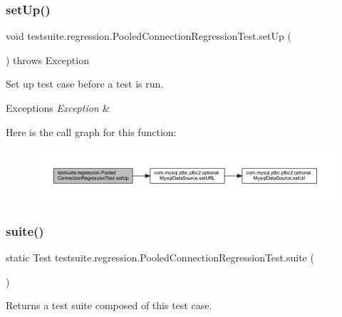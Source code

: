 \subsubsection{\texorpdfstring{set\+Up()}{setUp()}}
{\footnotesize\ttfamily void testsuite.\+regression.\+Pooled\+Connection\+Regression\+Test.\+set\+Up (\begin{DoxyParamCaption}{ }\end{DoxyParamCaption}) throws Exception}

Set up test case before a test is run.


\begin{DoxyExceptions}{Exceptions}
{\em Exception} & \\
\hline
\end{DoxyExceptions}
Here is the call graph for this function\+:
\nopagebreak
\begin{figure}[H]
\begin{center}
\leavevmode
\includegraphics[width=350pt]{classtestsuite_1_1regression_1_1_pooled_connection_regression_test_a0c76c551e31c7968aa02015599380523_cgraph}
\end{center}
\end{figure}
\mbox{\label{classtestsuite_1_1regression_1_1_pooled_connection_regression_test_ab5bce0e84e27d7745cb282860fe3297f}} 
\subsubsection{\texorpdfstring{suite()}{suite()}}
{\footnotesize\ttfamily static Test testsuite.\+regression.\+Pooled\+Connection\+Regression\+Test.\+suite (\begin{DoxyParamCaption}{ }\end{DoxyParamCaption})\hspace{0.3cm}{\ttfamily [static]}}

\begin{DoxyReturn}{Returns}
a test suite composed of this test case. 
\end{DoxyReturn}
\mbox{\label{classtestsuite_1_1regression_1_1_pooled_connection_regression_test_a7df03569e1b544c6d99eda49fe0fadc5}} 
